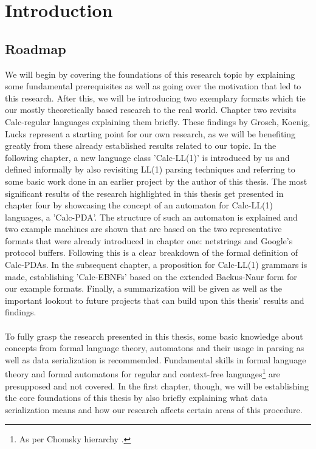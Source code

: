 \section{Introduction}
\label{1.0}
\subsection{Roadmap}
\label{1.1}
We will begin by covering the foundations of this research topic by explaining some fundamental prerequisites as well as going over the motivation that led to this research. After this, we will be introducing two exemplary formats which tie our mostly theoretically based research to the real world. Chapter two revisits Calc-regular languages explaining them briefly. These findings by Grosch, Koenig, Lucks \cite{Calc-regular-paper} represent a starting point for our own research, as we will be benefiting greatly from these already established results related to our topic. In the following chapter, a new language class 'Calc-LL(1)' is introduced by us and defined informally by also revisiting LL(1) parsing techniques and referring to some basic work done in an earlier project by the author of this thesis. The most significant results of the research highlighted in this thesis get presented in chapter four by showcasing the concept of an automaton for Calc-LL(1) languages, a 'Calc-PDA'. The structure of such an automaton is explained and two example machines are shown that are based on the two representative formats that were already introduced in chapter one: netstrings and Google's protocol buffers. Following this is a clear breakdown of the formal definition of Calc-PDAs. In the subsequent chapter, a proposition for Calc-LL(1) grammars is made, establishing 'Calc-EBNFs' based on the extended Backus-Naur form for our example formats.
Finally, a summarization will be given as well as the important lookout to future projects that can build upon this thesis' results and findings.\\\\
To fully grasp the research presented in this thesis, some basic knowledge about concepts from formal language theory, automatons and their usage in parsing as well as data serialization is recommended. Fundamental skills in formal language theory and formal automatons for regular and context-free languages\footnote{As per Chomsky hierarchy \cite{Chomsky-Hierarchy}.} are presupposed and not covered. In the first chapter, though, we will be establishing the core foundations of this thesis by also briefly explaining what data serialization means and how our research affects certain areas of this procedure.


